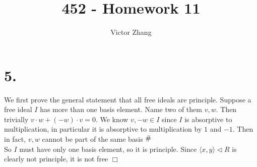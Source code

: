 \documentclass{article}
\title{452 - Homework 11}
\author{Victor Zhang}
\newcommand{\contra}{\raisebox{\depth}{\#}}
\begin{document}
\maketitle

\section*{5.}
We first prove the general statement that all free ideals are principle. Suppose a free ideal $I$ has more than one basis element. Name two of them $v,w$. Then trivially $v\cdot w + (-w) \cdot v = 0$. We know $v, -w \in I$ since $I$ is absorptive to multiplication, in particular it is absorptive to multiplication by $1$ and $-1$. Then in fact, $v,w$ cannot be part of the same basis $\contra$\\
So $I$ must have only one basis element, so it is principle. Since $\langle x,y \rangle \lhd R$ is clearly not principle, it is not free $\Box$
\end{document}
